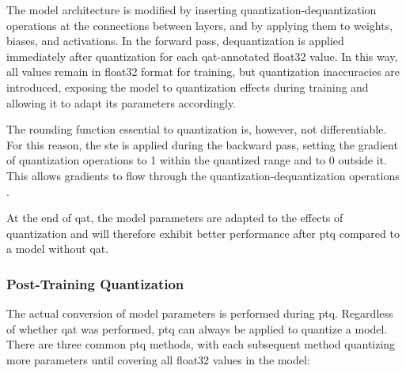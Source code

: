 {The model architecture is modified by inserting quantization-dequantization operations at the connections between layers,
and by applying them to weights, biases, and activations.
In the forward pass, dequantization is applied immediately after quantization for each \gls{qat}-annotated \gls{float32} value.
In this way, all values remain in \gls{float32} format for training,
but quantization inaccuracies are introduced, exposing the model to quantization effects during training and allowing it to adapt its parameters accordingly.

The rounding function essential to quantization is, however, not differentiable. For this reason, the \gls{ste} is applied during the backward pass,
setting the gradient of quantization operations to 1 within the quantized range and to 0 outside it.
This allows gradients to flow through the quantization-dequantization operations \cite{qatBackwardPass}.

At the end of \gls{qat}, the model parameters are adapted to the effects of quantization and will therefore exhibit better performance after \gls{ptq} compared to a model without \gls{qat}.


\subsubsection{Post-Training Quantization}

The actual conversion of model parameters is performed during \gls{ptq}.
Regardless of whether \gls{qat} was performed, \gls{ptq} can always be applied to quantize a model.
There are three common \gls{ptq} methods, with each subsequent method quantizing more parameters until covering all \gls{float32} values in the model:

}
